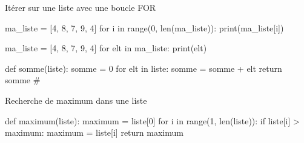 \begin{easybox}{Itérer sur une liste avec une boucle FOR}{}


	\begin{minipage}{0.48\linewidth}
		\begin{CodePythontexAlt}[TaillePolice=\normalsize, Largeur=1\linewidth,Centre,PremLigne=1, Lignes=false]{}
ma_liste = [4, 8, 7, 9, 4]
for i in range(0, len(ma_liste)):
	print(ma_liste[i])
		\end{CodePythontexAlt}
	\end{minipage}\hfill
	\begin{minipage}{0.48\linewidth}
		\begin{CodePythontexAlt}[TaillePolice=\normalsize, Largeur=1\linewidth,Centre,PremLigne=1, Lignes=false]{}
ma_liste = [4, 8, 7, 9, 4]
for elt in ma_liste:
	print(elt)
		\end{CodePythontexAlt}
	\end{minipage}
\end{easybox}

\begin{minipage}{0.48\linewidth}
\begin{easybox}{}
		\begin{CodePythontexAlt}[TaillePolice=\normalsize, Largeur=1\linewidth,Centre,PremLigne=1, Lignes=false]{}
def somme(liste):
	somme = 0
	for elt in liste:
		somme = somme + elt
	return somme
#
		\end{CodePythontexAlt}
\end{easybox}
\end{minipage}\hfill
	\begin{minipage}{0.48\linewidth}
		\begin{easybox}{Recherche de maximum dans une liste}{}
\begin{CodePythontexAlt}[TaillePolice=\normalsize, Largeur=1\linewidth,Centre,PremLigne=1, Lignes=false]{}
def maximum(liste):
	maximum = liste[0]
	for i in range(1, len(liste)):
		if liste[i] > maximum:
			maximum = liste[i]
	return maximum
\end{CodePythontexAlt}
	\end{easybox}
	\end{minipage}

